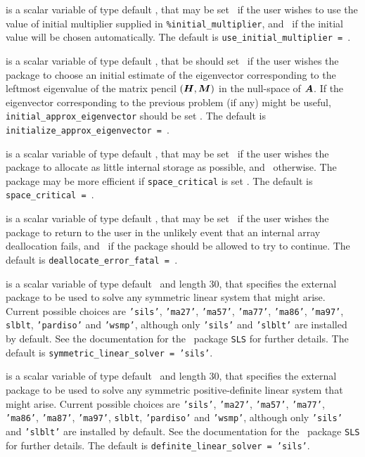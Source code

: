\documentclass{galahad}
\begin{document}
\begin{description}
 is a scalar variable of type default \logical,
that may be set \true\ if the user wishes to use the value of initial
multiplier supplied in {\tt \%initial\_multiplier},
and \false\ if the initial value will be chosen automatically.
The default is {\tt use\_initial\_multiplier = \false}.

 is a scalar variable of type default
\logical, that be should set \true\ if the user wishes the package to choose an
initial estimate of the eigenvector corresponding to the leftmost eigenvalue of
the matrix pencil $({\bm{H}},{\bm{M}})$ in the null-space of ${\bm{A}}$.
If the eigenvector corresponding to the previous
problem (if any) might be useful, {\tt initial\_approx\_eigenvector}
should be set \false.
The default is {\tt initialize\_approx\_eigenvector = \true}.

 is a scalar variable of type default \logical, that
may be set \true\ if the user wishes the package to allocate as little
internal storage as possible, and \false\ otherwise. The package may
be more efficient if {\tt space\_critical} is set \false.
The default is {\tt space\_critical = \false}.

 is a scalar variable of type default \logical,
that may be set \true\ if the user wishes the package to return to the user
in the unlikely event that an internal array deallocation fails,
and \false\ if the package should be allowed to try to continue.
The default is {\tt deallocate\_error\_fatal = \false}.

 is a scalar variable of type default \character\
and length 30, that specifies the external package to be used to
solve any symmetric linear system that might arise. Current possible
choices are {\tt 'sils'}, {\tt 'ma27'}, {\tt 'ma57'}, {\tt 'ma77'},
{\tt 'ma86'}, {\tt 'ma97'}, {\tt slblt}, {\tt 'pardiso'}
and {\tt 'wsmp'},
although only {\tt 'sils'} and {\tt 'slblt'} are installed by default.
See the documentation for the \galahad\ package {\tt SLS} for further details.
The default is {\tt symmetric\_linear\_solver = 'sils'}.

 is a scalar variable of type default \character\
and length 30, that specifies the external package to be used to
solve any symmetric positive-definite linear system that might arise.
Current possible
choices are {\tt 'sils'}, {\tt 'ma27'}, {\tt 'ma57'}, {\tt 'ma77'},
{\tt 'ma86'}, {\tt 'ma87'}, {\tt 'ma97'}, {\tt slblt}, {\tt 'pardiso'}
and {\tt 'wsmp'},
although only {\tt 'sils'} and {\tt 'slblt'} are installed by default.
See the documentation for the \galahad\ package {\tt SLS} for further details.
The default is {\tt definite\_linear\_solver = 'sils'}.


\end{description}
\end{document}
